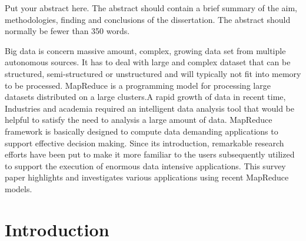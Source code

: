 \documentclass[11pt]{book}
\begin{document}


 Put your abstract  here.  The abstract should contain a brief summary of the aim, methodologies, 
finding and conclusions of the dissertation.  The abstract should normally be fewer than 350 words.


Big data is concern massive amount, complex, growing data set from multiple autonomous sources. It has to deal with large
and complex dataset that can be structured, semi-structured or unstructured and will typically not fit into memory to be processed.
MapReduce is a programming model for processing large datasets distributed on a large clusters.A rapid growth of data in recent time,
Industries and academia required an intelligent data analysis tool that would be helpful to satisfy the need to analysis a large amount of
data. MapReduce framework is basically designed to compute data demanding applications to support effective decision making. Since
its introduction, remarkable research efforts have been put to make it more familiar to the users subsequently utilized to support the
execution of enormous data intensive applications. This survey paper highlights and investigates various applications using recent
MapReduce models.







\setcounter{secnumdepth}{3} %
\setcounter{tocdepth}{3}    %
\tableofcontents            %

	
\chapter{Introduction}%
\end{document}
